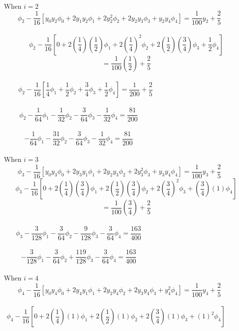 \documentclass[a4paper,12pt]{report}
\newcommand{\spn}[1]{\\[#1cm]}
\begin{document}
	\spn{-0.2}When $i=2$
	$$
		\phi_2 - \frac{1}{16}\left[y_0y_2\phi_0 + 2y_1y_2\phi_1 + 2y_2^2\phi_2 + 2y_2y_3\phi_3 + y_2y_4\phi_4\right] = \frac{1}{100}y_2 + \frac{2}{5} \quad\quad
	$$\spn{-.9}
	$$
		\phi_2 - \frac{1}{16}\left[0 + 2\left(\frac{1}{4}\right)\left(\frac{1}{2}\right)\phi_1 + 2\left(\frac{1}{4}\right)^2\phi_2 +2\left(\frac{1}{2}\right)\left(\frac{3}{4}\right)\phi_3 + \frac{1}{2}\phi_4\right]
	$$
	$$
		= \frac{1}{100}\left(\frac{1}{2}\right)+\frac{2}{5}
	$$\spn{-0.5}
	$$
		\phi_2 - \frac{1}{16}\left[\frac{1}{4}\phi_1 +\frac{1}{2}\phi_2 +\frac{3}{4}\phi_3 +\frac{1}{2}\phi_4\right] = \frac{1}{200}+\frac{2}{5}\quad\quad\quad\quad\quad\quad\quad\quad\quad\quad\quad\quad
	$$\spn{-0.8}
	$$
		\phi_2 - \frac{1}{64}\phi_1 -\frac{1}{32}\phi_2 -\frac{3}{64}\phi_3 -\frac{1}{32}\phi_4 = \frac{81}{200}\quad\quad\quad\quad\quad\quad\quad\quad\quad\quad\quad\quad\quad\quad
	$$\spn{-.8}
	\begin{equation}
		-\frac{1}{64}\phi_1 -\frac{31}{32}\phi_2 -\frac{3}{64}\phi_3 -\frac{1}{32}\phi_4 = \frac{81}{200} \tag{iii} \quad\quad\quad\quad\quad\quad\quad\quad\quad\quad\quad\quad\quad\quad
	\end{equation}
	\spn{-0.2}When $i=3$
	$$
		\phi_3 - \frac{1}{16}\left[y_0y_3\phi_0 + 2y_3y_1\phi_1 + 2y_2y_3\phi_2 + 2y_3^2\phi_3 + y_3y_4\phi_4\right] = \frac{1}{100}y_3 + \frac{2}{5} \quad\quad
	$$
	\newpage
	$$
		\phi_3 - \frac{1}{16}\left[0 + 2\left(\frac{1}{4}\right)\left(\frac{3}{4}\right)\phi_1 + 2\left(\frac{1}{2}\right)\left(\frac{3}{4}\right)\phi_2 +2\left(\frac{3}{4}\right)^2\phi_3 + \left(\frac{3}{4}\right)\left(1\right)\phi_4\right]
	$$
	$$
		= \frac{1}{100}\left(\frac{3}{4}\right)+\frac{2}{5}
	$$\spn{-0.5}
	$$
		\phi_3 - \frac{3}{128}\phi_1 -\frac{3}{64}\phi_2 -\frac{9}{128}\phi_3 -\frac{3}{64}\phi_4 = \frac{163}{400}\quad\quad\quad\quad\quad\quad\quad\quad\quad\quad\quad\quad\quad\quad
	$$\spn{-.8}
	\begin{equation}
		-\frac{3}{128}\phi_1 -\frac{3}{64}\phi_2 +\frac{119}{128}\phi_3 -\frac{3}{64}\phi_4 = \frac{163}{400} \tag{iv} \quad\quad\quad\quad\quad\quad\quad\quad\quad\quad\quad\quad\quad\quad
	\end{equation}
	\spn{-0.2}When $i=4$
	$$
		\phi_4 - \frac{1}{16}\left[y_0y_4\phi_0 + 2y_4y_1\phi_1 + 2y_2y_4\phi_2 + 2y_3y_4\phi_3 + y_4^2\phi_4\right] = \frac{1}{100}y_4 + \frac{2}{5} \quad\quad
	$$\spn{-.7}
	$$
		\phi_4 - \frac{1}{16}\left[0 + 2\left(\frac{1}{4}\right)\left(1\right)\phi_1 + 2\left(\frac{1}{2}\right)\left(1\right)\phi_2 +2\left(\frac{3}{4}\right)(1)\phi_3 + \left(1\right)^2\phi_4\right]\qquad\quad
	$$
\end{document}
